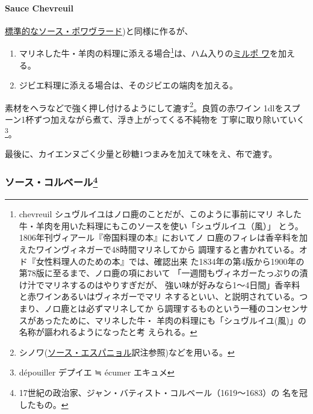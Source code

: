 \begin{recette}
\hypertarget{sauce-chevreuil}{%
\paragraph{Sauce Chevreuil}\label{sauce-chevreuil}}

    

\protect\hyperlink{sauce-poivrade}{標準的なソース・ポワヴラード})と同様に作るが、

\begin{enumerate}
\def\labelenumi{\arabic{enumi}.}
\item
  マリネした牛・羊肉の料理に添える場合\footnote{chevreuil
    シュヴルイユはノロ鹿のことだが、このように事前にマリ
    ネした牛・羊肉を用いた料理にもこのソースを使い「シュヴルイユ（風）」
    とう。1806年刊ヴィアール『帝国料理の本』においてノ
    ロ鹿のフィレは香辛料を加えたワインヴィネガーで48時間マリネしてから
    調理すると書かれている。オド『女性料理人のための本』では、確認出来
    た1834年の第4版から1900年の第78版に至るまで、ノロ鹿の項において
    「一週間もヴィネガーたっぷりの漬け汁でマリネするのはやりすぎだが、
    強い味が好みなら1〜4日間」香辛料と赤ワインあるいはヴィネガーでマリ
    ネするといい、と説明されている。つまり、ノロ鹿とは必ずマリネしてか
    ら調理するものという一種のコンセンサスがあったために、マリネした牛・
    羊肉の料理にも「シュヴルイユ(風)」の名称が謳われるようになったと考
    えられる。}は、ハム入りの\protect\hyperlink{mirepoix}{ミルポ
  ワ}を加える。
\item
  ジビエ料理に添える場合は、そのジビエの端肉を加える。
\end{enumerate}

素材をヘラなどで強く押し付けるようにして漉す\footnote{シノワ(\protect\hyperlink{sauce-espagnole}{ソース・エスパニョル}訳注参照)などを用いる。}。良質の赤ワイン
1\undemi{}dlをスプーン1杯ずつ加えながら煮て、浮き上がってくる不純物を
丁寧に取り除いていく\footnote{dépouiller デプイエ ≒ écumer エキュメ}。

最後に、カイエンヌごく少量と砂糖1つまみを加えて味をえ、布で漉す。

\maeaki

\hypertarget{ux30bdux30fcux30b9ux30b3ux30ebux30d9ux30fcux30eb23}{%
\subsubsection[ソース・コルベール]{\texorpdfstring{ソース・コルベール\footnote{17世紀の政治家、ジャン・バティスト・コルベール（1619〜1683）の
  名を冠したもの。}}{ソース・コルベール}}\label{ux30bdux30fcux30b9ux30b3ux30ebux30d9ux30fcux30eb23}}


\end{recette}
